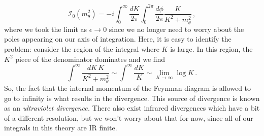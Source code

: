 \documentclass{article}
\numberwithin{equation}{subsection}
\begin{document}
\begin{equation}\label{eq:tadpole}
    \mathcal{I}_0(m_\theta^2) = -i\int_{0}^\infty\frac{dK}{2\pi}\int_0^{2\pi}\frac{d\phi}{2\pi}\frac{K}{K^2 + m_\theta^2}\,,
\end{equation}
where we took the limit as $\epsilon\to 0$ since we no longer need to worry about the poles appearing on our axis of integration. Here, it is easy to identify the problem: 
consider the region of the integral where $K$ is large. In this region, the $K^2$ piece of the denominator dominates and we find
\begin{equation}
    \int^\infty \frac{dK\,K}{K^2 + m_\theta^2} \sim \int^\infty \frac{dK}{K}\sim \lim_{K\to \infty}\log K\,.
\end{equation}
So, the fact that the internal momentum of the Feynman diagram is allowed to go to infinity is what results in the divergence. This source of divergence is known as an 
\textit{ultraviolet divergence.} There also exist infrared divergences which have a bit of a different resolution, but we won't worry about that for now, since all of our 
integrals in this theory are IR finite.
\end{document}
